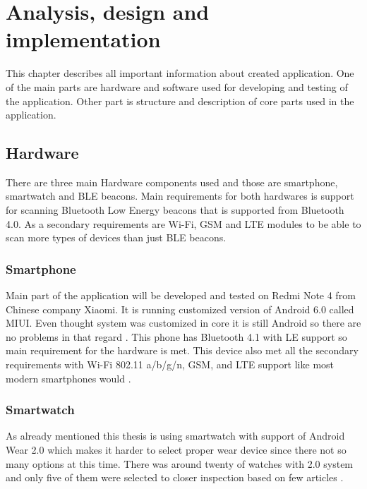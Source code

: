 \chapter{Analysis, design and implementation}\label{sec:AnalysisDesignAndImplementation}
This chapter describes all important information about created application. One of the main parts are hardware and software used for developing and testing of the application. Other part is structure and description of core parts used in the application. 

\section{Hardware}\label{sec:Hardware}
There are three main Hardware components used and those are smartphone, smartwatch and BLE beacons. Main requirements for both hardwares is support for scanning Bluetooth Low Energy beacons that is supported from Bluetooth 4.0. As a secondary requirements are Wi-Fi, GSM and LTE modules to be able to scan more types of devices than just BLE beacons.  


\subsection{Smartphone}\label{subsec:Smartphone}
Main part of the application will be developed and tested on Redmi Note 4 from Chinese company Xiaomi. It is running customized version of Android 6.0 called MIUI. Even thought system was customized in core it is still Android so there are no problems in that regard  \cite{XRN4LTE}. This phone has Bluetooth 4.1 with LE support so main requirement for the hardware is met. This device also met all the secondary requirements with Wi-Fi 802.11 a/b/g/n, GSM, and LTE support like most modern smartphones would \cite{XRN4FPS}.

\subsection{Smartwatch}\label{subsec:Smartwatch}
As already mentioned this thesis is using smartwatch with support of Android Wear 2.0 which makes it harder to select proper wear device since there not so many options at this time. There was around twenty of watches with 2.0 system and only five of them were selected to closer inspection based on few articles \cite{BAWW, BAWW18, BAWW17}.

